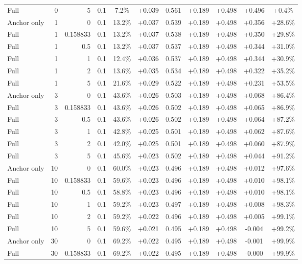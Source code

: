 \begin{table}[htbp]
\begin{tabular}{lrrrccccccc}
Full & 0 & 5 & 0.1 & 7.2\% & +0.039 & 0.561 & +0.189 & +0.498 & +0.496 & +0.4\% \\
Anchor only & 1 & 0 & 0.1 & 13.2\% & +0.037 & 0.539 & +0.189 & +0.498 & +0.356 & +28.6\% \\
Full & 1 & 0.158833 & 0.1 & 13.2\% & +0.037 & 0.538 & +0.189 & +0.498 & +0.350 & +29.8\% \\
Full & 1 & 0.5 & 0.1 & 13.2\% & +0.037 & 0.537 & +0.189 & +0.498 & +0.344 & +31.0\% \\
Full & 1 & 1 & 0.1 & 12.4\% & +0.036 & 0.537 & +0.189 & +0.498 & +0.344 & +30.9\% \\
Full & 1 & 2 & 0.1 & 13.6\% & +0.035 & 0.534 & +0.189 & +0.498 & +0.322 & +35.2\% \\
Full & 1 & 5 & 0.1 & 21.6\% & +0.029 & 0.522 & +0.189 & +0.498 & +0.231 & +53.5\% \\
Anchor only & 3 & 0 & 0.1 & 43.6\% & +0.026 & 0.503 & +0.189 & +0.498 & +0.068 & +86.4\% \\
Full & 3 & 0.158833 & 0.1 & 43.6\% & +0.026 & 0.502 & +0.189 & +0.498 & +0.065 & +86.9\% \\
Full & 3 & 0.5 & 0.1 & 43.6\% & +0.026 & 0.502 & +0.189 & +0.498 & +0.064 & +87.2\% \\
Full & 3 & 1 & 0.1 & 42.8\% & +0.025 & 0.501 & +0.189 & +0.498 & +0.062 & +87.6\% \\
Full & 3 & 2 & 0.1 & 42.0\% & +0.025 & 0.501 & +0.189 & +0.498 & +0.060 & +87.9\% \\
Full & 3 & 5 & 0.1 & 45.6\% & +0.023 & 0.502 & +0.189 & +0.498 & +0.044 & +91.2\% \\
Anchor only & 10 & 0 & 0.1 & 60.0\% & +0.023 & 0.496 & +0.189 & +0.498 & +0.012 & +97.6\% \\
Full & 10 & 0.158833 & 0.1 & 59.6\% & +0.023 & 0.496 & +0.189 & +0.498 & +0.010 & +98.1\% \\
Full & 10 & 0.5 & 0.1 & 58.8\% & +0.023 & 0.496 & +0.189 & +0.498 & +0.010 & +98.1\% \\
Full & 10 & 1 & 0.1 & 59.2\% & +0.023 & 0.497 & +0.189 & +0.498 & +0.008 & +98.3\% \\
Full & 10 & 2 & 0.1 & 59.2\% & +0.022 & 0.496 & +0.189 & +0.498 & +0.005 & +99.1\% \\
Full & 10 & 5 & 0.1 & 59.6\% & +0.021 & 0.495 & +0.189 & +0.498 & -0.004 & +99.2\% \\
Anchor only & 30 & 0 & 0.1 & 69.2\% & +0.022 & 0.495 & +0.189 & +0.498 & -0.001 & +99.9\% \\
Full & 30 & 0.158833 & 0.1 & 69.2\% & +0.022 & 0.495 & +0.189 & +0.498 & -0.000 & +99.9\% \\

\end{tabular}
\end{table}
